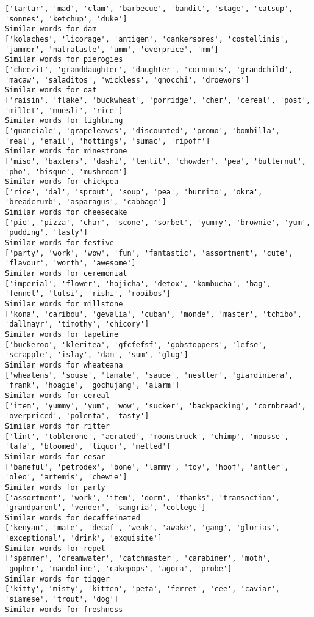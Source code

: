 \documentclass[11pt]{article}
\begin{document}
\begin{Verbatim}[commandchars=\\\{\}]
['tartar', 'mad', 'clam', 'barbecue', 'bandit', 'stage', 'catsup', 'sonnes', 'ketchup', 'duke']
Similar words for dam
['kolaches', 'licorage', 'antigen', 'cankersores', 'costellinis', 'jammer', 'natrataste', 'umm', 'overprice', 'mm']
Similar words for pierogies
['cheezit', 'granddaughter', 'daughter', 'cornnuts', 'grandchild', 'macaw', 'saladitos', 'wickless', 'gnocchi', 'droewors']
Similar words for oat
['raisin', 'flake', 'buckwheat', 'porridge', 'cher', 'cereal', 'post', 'millet', 'muesli', 'rice']
Similar words for lightning
['guanciale', 'grapeleaves', 'discounted', 'promo', 'bombilla', 'real', 'email', 'hottings', 'sumac', 'ripoff']
Similar words for minestrone
['miso', 'baxters', 'dashi', 'lentil', 'chowder', 'pea', 'butternut', 'pho', 'bisque', 'mushroom']
Similar words for chickpea
['rice', 'dal', 'sprout', 'soup', 'pea', 'burrito', 'okra', 'breadcrumb', 'asparagus', 'cabbage']
Similar words for cheesecake
['pie', 'pizza', 'char', 'scone', 'sorbet', 'yummy', 'brownie', 'yum', 'pudding', 'tasty']
Similar words for festive
['party', 'work', 'wow', 'fun', 'fantastic', 'assortment', 'cute', 'flavour', 'worth', 'awesome']
Similar words for ceremonial
['imperial', 'flower', 'hojicha', 'detox', 'kombucha', 'bag', 'fennel', 'tulsi', 'rishi', 'rooibos']
Similar words for millstone
['kona', 'caribou', 'gevalia', 'cuban', 'monde', 'master', 'tchibo', 'dallmayr', 'timothy', 'chicory']
Similar words for tapeline
['buckeroo', 'kleritea', 'gfcfefsf', 'gobstoppers', 'lefse', 'scrapple', 'islay', 'dam', 'sum', 'glug']
Similar words for wheateana
['wheatens', 'souse', 'tamale', 'sauce', 'nestler', 'giardiniera', 'frank', 'hoagie', 'gochujang', 'alarm']
Similar words for cereal
['item', 'yummy', 'yum', 'wow', 'sucker', 'backpacking', 'cornbread', 'overpriced', 'polenta', 'tasty']
Similar words for ritter
['lint', 'toblerone', 'aerated', 'moonstruck', 'chimp', 'mousse', 'tafa', 'bloomed', 'liquor', 'melted']
Similar words for cesar
['baneful', 'petrodex', 'bone', 'lammy', 'toy', 'hoof', 'antler', 'oleo', 'artemis', 'chewie']
Similar words for party
['assortment', 'work', 'item', 'dorm', 'thanks', 'transaction', 'grandparent', 'vender', 'sangria', 'college']
Similar words for decaffeinated
['kenyan', 'mate', 'decaf', 'weak', 'awake', 'gang', 'glorias', 'exceptional', 'drink', 'exquisite']
Similar words for repel
['spammer', 'dreamwater', 'catchmaster', 'carabiner', 'moth', 'gopher', 'mandoline', 'cakepops', 'agora', 'probe']
Similar words for tigger
['kitty', 'misty', 'kitten', 'peta', 'ferret', 'cee', 'caviar', 'siamese', 'trout', 'dog']
Similar words for freshness

\end{Verbatim}
\end{document}
